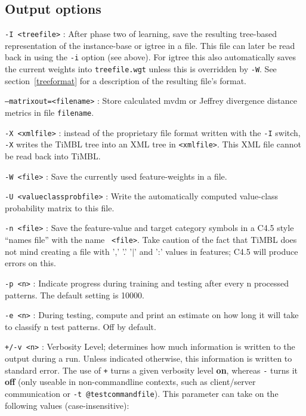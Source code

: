 \documentclass{report}
\begin{document}
\subsection{Output options}

\begin{description}

\item {\tt -I <treefile>} : After phase two of learning, save
  the resulting tree-based representation of the instance-base or {\sc
    igtree} in a file. This file can later be read back in using the
  {\tt -i} option (see above). For {\sc igtree} this also automatically
  saves the current weights into {\tt treefile.wgt} unless this is
  overridden by {\tt -W}.
  See section~\ref{treeformat} for a description of the resulting file's format.

\item {\tt --matrixout=<filename>} : Store calculated {\sc mvdm} or Jeffrey divergence distance metrics in file {\tt filename}.

\item {\tt -X <xmlfile>} : instead of the proprietary file format
  written with the {\tt -I} switch, {\tt -X} writes the TiMBL tree
  into an XML tree in {\tt <xmlfile>}. This XML file cannot be read
  back into TiMBL.

\item {\tt -W <file>} : Save the currently used feature-weights in a
file.

\item {\tt -U <valueclassprobfile>} : Write the automatically computed
value-class probability matrix to this file.

\item {\tt -n <file>} : Save the feature-value and target category
symbols in a C4.5 style ``names file'' with the name {\tt
<file>}. Take caution of the fact that TiMBL does not mind creating a
file with ',' '.' '$|$' and ':' values in features; C4.5 will produce errors on this.

\item {\tt -p <n>} : Indicate progress during training and testing
after every n processed patterns. The default setting is 10000.

\item {\tt -e <n>} : During testing, compute and print an estimate on
how long it will take to classify n test patterns. Off by
default.

\item {\tt +/-v <n>} : Verbosity Level; determines how much
information is written to the output during a run. Unless indicated
otherwise, this information is written to standard error. The use of
{\tt +} turns a given verbosity level {\bf on}, whereas {\tt -} turns
it {\bf off} (only useable in non-commandline contexts, such as
client/server communication or {\tt -t @testcommandfile}). This
parameter can take on the following values (case-insensitive):


\end{description}
\end{document}
